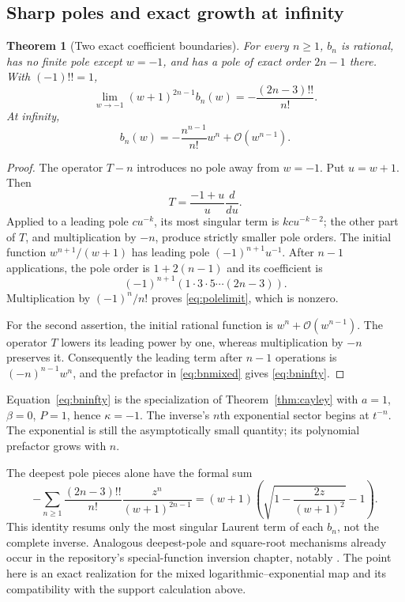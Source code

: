 \documentclass[11pt,a4paper]{article}
\newtheorem{theorem}{Theorem}[section]
\theoremstyle{definition}
\theoremstyle{remark}
\newcommand{\OO}{\mathcal O}
\newcommand{\repoLabel}[1]{\texttt{\detokenize{#1}}}
\begin{document}
\subsection{Sharp poles and exact growth at infinity}
\begin{theorem}[Two exact coefficient boundaries]\label{thm:mixedpoles}
For every $n\ge1$, $b_n$ is rational, has no finite pole except $w=-1$,
and has a pole of exact order $2n-1$ there. With $(-1)!!=1$,
\begin{equation}\label{eq:polelimit}
 \lim_{w\to-1}(w+1)^{2n-1}b_n(w)
       =-\frac{(2n-3)!!}{n!}.
\end{equation}
At infinity,
\begin{equation}\label{eq:bninfty}
 b_n(w)=-\frac{n^{n-1}}{n!}w^n+\OO(w^{n-1}).
\end{equation}
\end{theorem}
\begin{proof}
The operator $T-n$ introduces no pole away from $w=-1$. Put $u=w+1$.
Then
\[
 T=\frac{-1+u}{u}\frac{d}{du}.
\]
Applied to a leading pole $c u^{-k}$, its most singular term is
$kc u^{-k-2}$; the other part of $T$, and multiplication by $-n$, produce
strictly smaller pole orders. The initial function
$w^{n+1}/(w+1)$ has leading pole $(-1)^{n+1}u^{-1}$.
After $n-1$ applications, the pole order is $1+2(n-1)$ and its
coefficient is
\[
 (-1)^{n+1}(1\cdot3\cdot5\cdots(2n-3)).
\]
Multiplication by $(-1)^n/n!$ proves \eqref{eq:polelimit}, which is nonzero.

For the second assertion, the initial rational function is
$w^n+\OO(w^{n-1})$. The operator $T$ lowers its leading power by one,
whereas multiplication by $-n$ preserves it. Consequently the leading
term after $n-1$ operations is $(-n)^{n-1}w^n$, and the prefactor in
\eqref{eq:bnmixed} gives \eqref{eq:bninfty}.
\end{proof}

Equation~\eqref{eq:bninfty} is the specialization of
Theorem~\ref{thm:cayley} with $a=1$, $\beta=0$, $P=1$, hence
$\kappa=-1$. The inverse's $n$th exponential sector begins at $t^{-n}$.
The exponential is still the asymptotically small quantity; its polynomial
prefactor grows with $n$.

The deepest pole pieces alone have the formal sum
\begin{equation}\label{eq:deepestResum}
 -\sum_{n\ge1}\frac{(2n-3)!!}{n!}
          \frac{z^n}{(w+1)^{2n-1}}
 =(w+1)\left(\sqrt{1-\frac{2z}{(w+1)^2}}-1\right).
\end{equation}
This identity resums only the most singular Laurent term of each $b_n$,
not the complete inverse. Analogous deepest-pole and square-root mechanisms
already occur in the repository's special-function inversion chapter,
notably \repoLabel{p6:thm:deepest-pole} \cite{ProveIt}. The point here is an
exact realization for the mixed logarithmic--exponential map and its
compatibility with the support calculation above.
\end{document}
